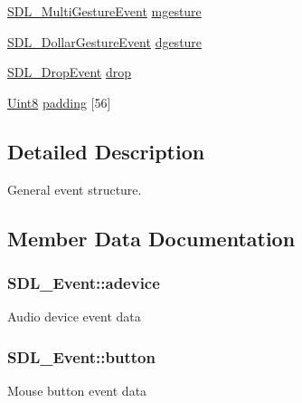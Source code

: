 \begin{DoxyCompactItemize}
\hyperlink{struct_s_d_l___multi_gesture_event}{S\+D\+L\+\_\+\+Multi\+Gesture\+Event} \hyperlink{union_s_d_l___event_ac19b3c6a6b5181a51eb4fbe2cbe726a9}{mgesture}
\item 
\hyperlink{struct_s_d_l___dollar_gesture_event}{S\+D\+L\+\_\+\+Dollar\+Gesture\+Event} \hyperlink{union_s_d_l___event_a4481167b9f8549aeb254e97ca812e74d}{dgesture}
\item 
\hyperlink{struct_s_d_l___drop_event}{S\+D\+L\+\_\+\+Drop\+Event} \hyperlink{union_s_d_l___event_acff77bccbca65abbb876360a3f5209c9}{drop}
\item 
\hyperlink{_s_d_l__stdinc_8h_a2944638813a090aa23e62f4da842c3e2}{Uint8} \hyperlink{union_s_d_l___event_aabb599570edfa54aad6255c1f24f2ad2}{padding} \mbox{[}56\mbox{]}
\end{DoxyCompactItemize}


\subsection{Detailed Description}
General event structure. 

\subsection{Member Data Documentation}
\subsubsection[{\texorpdfstring{adevice}{adevice}}]{ S\+D\+L\+\_\+\+Event\+::adevice}\hypertarget{union_s_d_l___event_a111e01fcac4fd8e251a6058ff9f17e72}{}\label{union_s_d_l___event_a111e01fcac4fd8e251a6058ff9f17e72}
Audio device event data 
\subsubsection[{\texorpdfstring{button}{button}}]{ S\+D\+L\+\_\+\+Event\+::button}\hypertarget{union_s_d_l___event_ab6da2fa2687e5f849f270adecc64785f}{}\label{union_s_d_l___event_ab6da2fa2687e5f849f270adecc64785f}
Mouse button event data 

